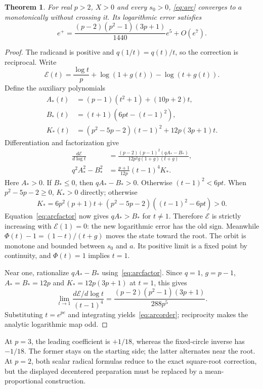 \documentclass[11pt,a4paper]{article}
\newtheorem{theorem}{Theorem}[section]\newtheorem{proposition}[theorem]{Proposition}
\begin{document}
\begin{theorem}\label{thm:arc}
For real $p>2$, $X>0$ and every $s_0>0$, \eqref{eq:arc} converges to $a$ monotonically without crossing it. Its logarithmic error satisfies
\begin{equation}\label{eq:arcorder}
 e^+=\frac{(p-2)(p^2-1)(3p+1)}{1440}e^5+O(e^7).
\end{equation}
\end{theorem}
\begin{proof}
The radicand is positive and $q(1/t)=q(t)/t$, so the correction is reciprocal. Write
\[
 \mathcal E(t)=\frac{\log t}{p}+\log(1+g(t))-\log(t+g(t)).
\]
Define the auxiliary polynomials
\begin{align*}
 A_*(t)&=(p-1)(t^2+1)+(10p+2)t,\\
 B_*(t)&=(t+1)(6pt-(t-1)^2),\\
 K_*(t)&=(p^2-5p-2)(t-1)^2+12p(3p+1)t.
\end{align*}
Differentiation and factorization give
\begin{align}
 \frac{d\mathcal E}{d\log t}
 &=\frac{(p-2)(p-1)^2(qA_*-B_*)}{12p^2g(1+g)(t+g)},\label{eq:arcder}\\
 q^2A_*^2-B_*^2&=\frac{p+1}{12p}(t-1)^4K_* .\label{eq:arcfactor}
\end{align}
Here $A_*>0$. If $B_*\le0$, then $qA_*-B_*>0$. Otherwise $(t-1)^2<6pt$. When $p^2-5p-2\ge0$, $K_*>0$ directly; otherwise
\[
 K_*=6p^2(p+1)t+(p^2-5p-2)((t-1)^2-6pt)>0.
\]
Equation~\eqref{eq:arcfactor} now gives $qA_*>B_*$ for $t\ne1$. Therefore $\mathcal E$ is strictly increasing with $\mathcal E(1)=0$: the new logarithmic error has the old sign. Meanwhile $\Phi(t)-1=(1-t)/(t+g)$ moves the state toward the root. The orbit is monotone and bounded between $s_0$ and $a$. Its positive limit is a fixed point by continuity, and $\Phi(t)=1$ implies $t=1$.

Near one, rationalize $qA_*-B_*$ using~\eqref{eq:arcfactor}. Since $q=1$, $g=p-1$, $A_*=B_*=12p$ and $K_*=12p(3p+1)$ at $t=1$, this gives
\[
 \lim_{t\to1}\frac{d\mathcal E/d\log t}{(t-1)^4}
 =\frac{(p-2)(p^2-1)(3p+1)}{288p^5}.
\]
Substituting $t=e^{pe}$ and integrating yields~\eqref{eq:arcorder}; reciprocity makes the analytic logarithmic map odd.
\end{proof}
At $p=3$, the leading coefficient is $+1/18$, whereas the fixed-circle inverse has $-1/18$. The former stays on the starting side; the latter alternates near the root. At $p=2$, both scalar radical formulas reduce to the exact square-root correction, but the displayed decentered preparation must be replaced by a mean-proportional construction.
\end{document}
